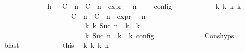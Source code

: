\begin{isabellebody}
\ {\isacharminus}\isanewline
\ \ \ \ \ \ \ \ \ \ \isamarkupfalse%
\ h{\isacharcolon}{\isacartoucheopen}{\isasymrho}\ {\isasymin}\ {\isasymlbrakk}\ {\isacharparenleft}{\isacharparenleft}C\ {\isasymUp}\ n{\isacharparenright}\ {\isacharhash}\ {\isacharparenleft}C\ {\isasymDown}\ n\ {\isacharat}{\isasymsharp}\ {\isasymtau}\isactrlsub e\isactrlsub x\isactrlsub p\isactrlsub r{\isacharparenright}\ {\isacharhash}\ {\isasymGamma}{\isacharparenright}{\isacharcomma}\ n\ {\isasymturnstile}\ {\isasymPsi}\ {\isasymtriangleright}\ {\isasymPhi}\ {\isasymrbrakk}\isactrlsub c\isactrlsub o\isactrlsub n\isactrlsub f\isactrlsub i\isactrlsub g{\isacartoucheclose}\isanewline
\ \ \ \ \ \ \ \ \ \ \isamarkupfalse%
\ {\isacartoucheopen}{\isasymexists}{\isasymGamma}\isactrlsub k\ {\isasymPsi}\isactrlsub k\ {\isasymPhi}\isactrlsub k\ k{\isachardot}\isanewline
\ \ \ \ \ \ \ \ \ \ \ \ \ \ \ \ \ \ \ \ {\isacharparenleft}{\isacharparenleft}{\isacharparenleft}{\isacharparenleft}C\ {\isasymUp}\ n{\isacharparenright}\ {\isacharhash}\ {\isacharparenleft}C\ {\isasymDown}\ n\ {\isacharat}{\isasymsharp}\ {\isasymtau}\isactrlsub e\isactrlsub x\isactrlsub p\isactrlsub r{\isacharparenright}\ {\isacharhash}\ {\isasymGamma}{\isacharparenright}{\isacharcomma}\ n\ {\isasymturnstile}\ {\isasymPsi}\ {\isasymtriangleright}\ {\isasymPhi}{\isacharparenright}\isanewline
\ \ \ \ \ \ \ \ \ \ \ \ \ \ \ \ \ \ \ \ \ \ \ \ {\isasymhookrightarrow}\isactrlbsup k\isactrlesup \ {\isacharparenleft}{\isasymGamma}\isactrlsub k{\isacharcomma}\ Suc\ n\ {\isasymturnstile}\ {\isasymPsi}\isactrlsub k\ {\isasymtriangleright}\ {\isasymPhi}\isactrlsub k{\isacharparenright}{\isacharparenright}\isanewline
\ \ \ \ \ \ \ \ \ \ \ \ \ \ \ \ \ \ \ \ {\isasymand}\ {\isasymrho}\ {\isasymin}\ {\isasymlbrakk}\ {\isasymGamma}\isactrlsub k{\isacharcomma}\ Suc\ n\ {\isasymturnstile}\ {\isasymPsi}\isactrlsub k\ {\isasymtriangleright}\ {\isasymPhi}\isactrlsub k\ {\isasymrbrakk}\isactrlsub c\isactrlsub o\isactrlsub n\isactrlsub f\isactrlsub i\isactrlsub g{\isacartoucheclose}\isanewline
\ \ \ \ \ \ \ \ \ \ \ \ \isamarkupfalse%
\ Cons{\isachardot}hyps\ \isamarkupfalse%
\ blast\isanewline
\ \ \ \ \ \ \ \ \ \ \isamarkupfalse%
\ this\ \isamarkupfalse%
\ {\isasymGamma}\isactrlsub k\ {\isasymPsi}\isactrlsub k\ {\isasymPhi}\isactrlsub k\ k\ \isanewline

\end{isabellebody}
